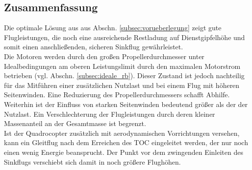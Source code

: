 \subsection{Zusammenfassung}
\label{subsec:ergebnisse}
Die optimale Lösung aus aus Abschn. \ref{subsec:vorueberlegung} zeigt gute Flugleistungen, die noch eine ausreichende Restladung auf Dienstgipfelhöhe und somit einen anschließenden, sicheren Sinkflug gewährleistet. \\
Die Motoren werden durch den großen Propellerdurchmesser unter Idealbedingungen am oberen Leistungslimit durch den maximalen Motorstrom betrieben (vgl. Abschn. \ref{subsec:ideale_rb}). Dieser Zustand ist jedoch nachteilig für das Mitführen einer zusätzlichen Nutzlast und bei einem Flug mit höheren Seitenwinden. Eine Reduzierung des Propellerdurchmessers schafft Abhilfe. Weiterhin ist der Einfluss von starken Seitenwinden bedeutend größer als der der Nutzlast. Ein Verschlechterung der Flugleistungen durch deren kleiner Massenanteil an der Gesamtmasse ist begrenzt.\\
Ist der Quadrocopter zusätzlich mit aerodynamischen Vorrichtungen versehen, kann ein Gleitflug nach dem Erreichen des TOC eingeleitet werden, der nur noch einen wenig Energie beansprucht. Der Punkt vor dem zwingenden Einleiten des Sinkflugs verschiebt sich damit in noch größere Flughöhen.

